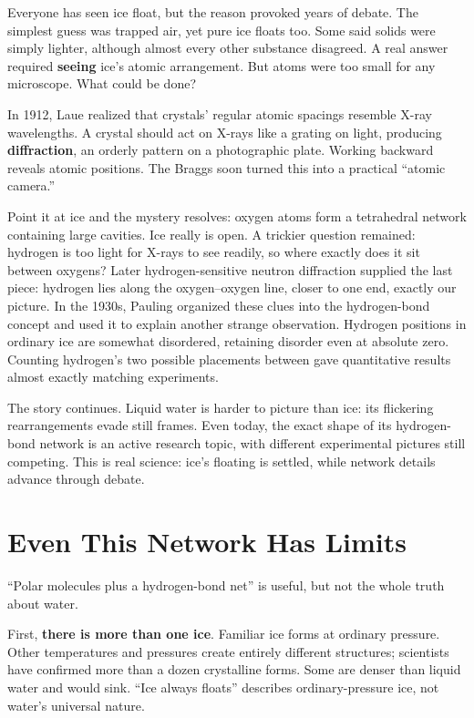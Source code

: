 \begin{zhengju}
Everyone has seen ice float, but the reason provoked years of debate. The simplest guess was trapped air, yet pure ice floats too. Some said solids were simply lighter, although almost every other substance disagreed. A real answer required \textbf{seeing} ice's atomic arrangement. But atoms were too small for any microscope. What could be done?

In 1912, Laue realized that crystals' regular atomic spacings resemble X-ray wavelengths. A crystal should act on X-rays like a grating on light, producing \textbf{diffraction}, an orderly pattern on a photographic plate. Working backward reveals atomic positions. The Braggs soon turned this into a practical ``atomic camera.''

Point it at ice and the mystery resolves: oxygen atoms form a tetrahedral network containing large cavities. Ice really is open. A trickier question remained: hydrogen is too light for X-rays to see readily, so where exactly does it sit between oxygens? Later hydrogen-sensitive neutron diffraction supplied the last piece: hydrogen lies along the oxygen--oxygen line, closer to one end, exactly our  picture. In the 1930s, Pauling organized these clues into the hydrogen-bond concept and used it to explain another strange observation. Hydrogen positions in ordinary ice are somewhat disordered, retaining disorder even at absolute zero. Counting hydrogen's two possible placements between  gave quantitative results almost exactly matching experiments.

The story continues. Liquid water is harder to picture than ice: its flickering rearrangements evade still frames. Even today, the exact shape of its hydrogen-bond network is an active research topic, with different experimental pictures still competing. This is real science: ice's floating is settled, while network details advance through debate.
\end{zhengju}

\section{Even This Network Has Limits}

``Polar molecules plus a hydrogen-bond net'' is useful, but not the whole truth about water.

First, \textbf{there is more than one ice}. Familiar ice forms at ordinary pressure. Other temperatures and pressures create entirely different structures; scientists have confirmed more than a dozen crystalline forms. Some are denser than liquid water and would sink. ``Ice always floats'' describes ordinary-pressure ice, not water's universal nature.

